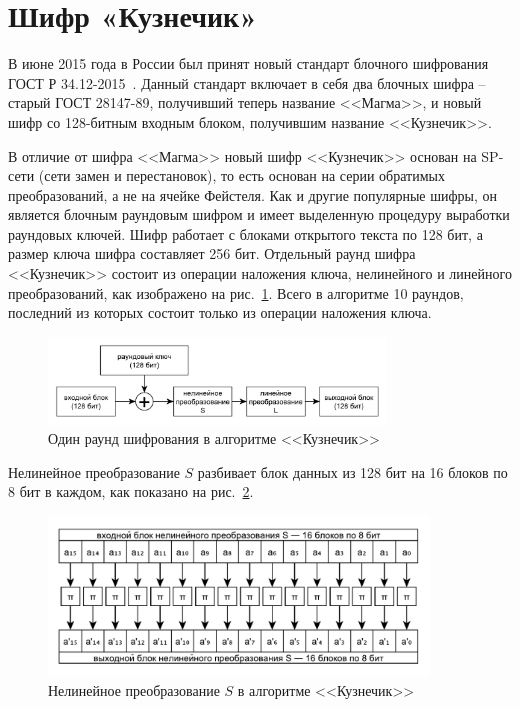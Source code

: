 \section{Шифр «Кузнечик»}\label{section-grig}

В июне 2015 года в России был принят новый стандарт блочного шифрования ГОСТ Р 34.12-2015~\cite{GOST-R:34.12-2015}. Данный стандарт включает в себя два блочных шифра -- старый ГОСТ 28147-89, получивший теперь название <<Магма>>, и новый шифр со 128-битным входным блоком, получившим название <<Кузнечик>>.

В отличие от шифра <<Магма>> новый шифр <<Кузнечик>> основан на SP-сети (сети замен и перестановок), то есть основан на серии обратимых преобразований, а не на ячейке Фейстеля. Как и другие популярные шифры, он является блочным раундовым шифром и имеет выделенную процедуру выработки раундовых ключей. Шифр работает с блоками открытого текста по 128 бит, а размер ключа шифра составляет 256 бит. Отдельный раунд шифра <<Кузнечик>> состоит из операции наложения ключа, нелинейного и линейного преобразований, как изображено на рис.~\ref{fig:kuznechik-step}. Всего в алгоритме 10 раундов, последний из которых состоит только из операции наложения ключа. 

\begin{figure}[htb]
	\centering
	\includegraphics[width=0.8\textwidth]{pic/kuznechik-step}
  \caption{Один раунд шифрования в алгоритме <<Кузнечик>>}
  \label{fig:kuznechik-step}
\end{figure}

Нелинейное преобразование $S$ разбивает блок данных из 128 бит на 16 блоков по 8 бит в каждом, как показано на рис.~\ref{fig:kuznechik-s}.

\begin{figure}[htb]
	\centering
	\includegraphics[width=0.9\textwidth]{pic/kuznechik-s}
  \caption{Нелинейное преобразование $S$ в алгоритме <<Кузнечик>>}
  \label{fig:kuznechik-s}
\end{figure}

